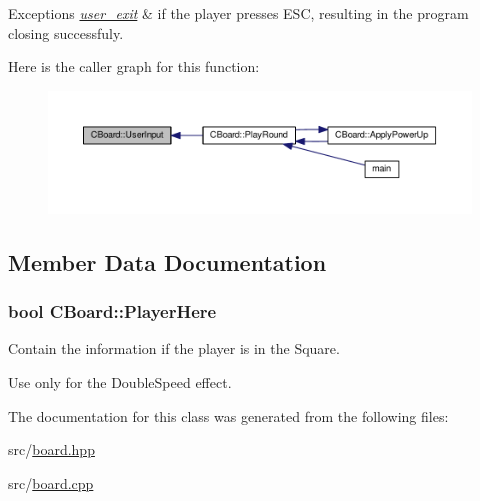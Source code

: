 \begin{DoxyExceptions}{Exceptions}
{\em \hyperlink{structuser__exit}{user\-\_\-exit}} & if the player presses E\-S\-C, resulting in the program closing successfuly. \\
\hline
\end{DoxyExceptions}


Here is the caller graph for this function\-:
\nopagebreak
\begin{figure}[H]
\begin{center}
\leavevmode
\includegraphics[width=350pt]{class_c_board_a1a48e50a148927a5cf49f8261777d5fa_icgraph}
\end{center}
\end{figure}




\subsection{Member Data Documentation}
\hypertarget{class_c_board_a1c54c3f6d57fad2c447cbabcb66d2e29}{
\subsubsection[{Player\-Here}]{\setlength{\rightskip}{0pt plus 5cm}bool C\-Board\-::\-Player\-Here\hspace{0.3cm}{\ttfamily [private]}}}\label{class_c_board_a1c54c3f6d57fad2c447cbabcb66d2e29}


Contain the information if the player is in the Square. 

Use only for the Double\-Speed effect. 

The documentation for this class was generated from the following files\-:\begin{DoxyCompactItemize}
\item 
src/\hyperlink{board_8hpp}{board.\-hpp}\item 
src/\hyperlink{board_8cpp}{board.\-cpp}\end{DoxyCompactItemize}
